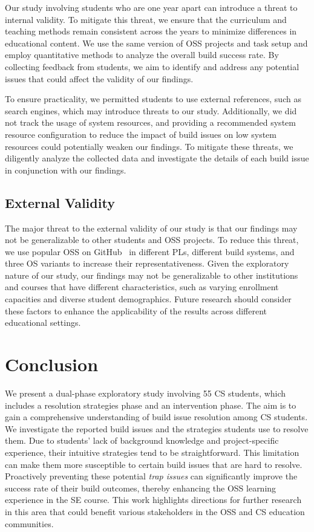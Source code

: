 \documentclass[10pt, conference]{IEEEtran}
\begin{document}
Our study involving students who are one year apart can introduce a threat to internal validity. To mitigate this threat, we ensure that the curriculum and teaching methods remain consistent across the years to minimize differences in educational content. We use the same version of OSS projects and task setup and employ quantitative methods to analyze the overall build success rate. By collecting feedback from students, we aim to identify and address any potential issues that could affect the validity of our findings.

To ensure practicality, we permitted students to use external references, such as search engines, which may introduce threats to our study. Additionally, we did not track the usage of system resources, and providing a recommended system resource configuration to reduce the impact of build issues on low system resources could potentially weaken our findings. To mitigate these threats, we diligently analyze the collected data and investigate the details of each build issue in conjunction with our findings.

\subsection{External Validity}
The major threat to the external validity of our study is that our findings may not be generalizable to other students and OSS projects. To reduce this threat, we use popular OSS on GitHub~\cite{github} in different PLs, different build systems, and three OS variants to increase their representativeness. Given the exploratory nature of our study, our findings may not be generalizable to other institutions and courses that have different characteristics, such as varying enrollment capacities and diverse student demographics. Future research should consider these factors to enhance the applicability of the results across different educational settings.



\section{Conclusion}
\label{sec:conclude}
We present a dual-phase exploratory study involving 55 CS students, which includes a resolution strategies phase and an intervention phase. The aim is to gain a comprehensive understanding of build issue resolution among CS students. We investigate the reported build issues and the strategies students use to resolve them. Due to students' lack of background knowledge and project-specific experience, their intuitive strategies tend to be straightforward. This limitation can make them more susceptible to certain build issues that are hard to resolve. Proactively preventing these potential \textit{trap issues} can significantly improve the success rate of their build outcomes, thereby enhancing the OSS learning experience in the SE course. This work highlights directions for further research in this area that could benefit various stakeholders in the OSS and CS education communities.



\end{document}
